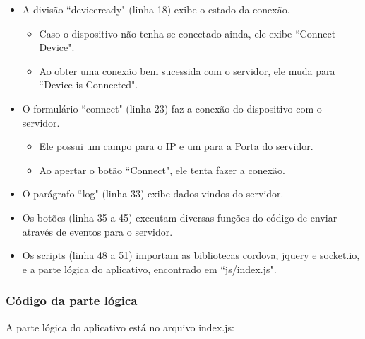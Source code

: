 \documentclass[a4paper,12pt]{article}
\begin{document}
\begin{itemize}
\item A divisão “deviceready" (linha 18) exibe o estado da conexão.

\begin{itemize}
\item Caso o dispositivo não tenha se conectado ainda, ele exibe “Connect Device".

\item Ao obter uma conexão bem sucessida com o servidor, ele muda para “Device is Connected".
\end{itemize}

\item O formulário “connect" (linha 23) faz a conexão do dispositivo com o servidor.

\begin{itemize}
\item Ele possui um campo para o IP e um para a Porta do servidor.

\item Ao apertar o botão “Connect", ele tenta fazer a conexão.
\end{itemize}

\item O parágrafo “log" (linha 33) exibe dados vindos do servidor.

\item Os botões (linha 35 a 45) executam diversas funções do código de enviar através de eventos para o servidor.

\item Os scripts (linha 48 a 51) importam as bibliotecas cordova, jquery e socket.io, e a parte lógica do aplicativo, encontrado em “js/index.js".
\end{itemize}


\subsubsection{Código da parte lógica}

A parte lógica do aplicativo está no arquivo index.js:
\end{document}
